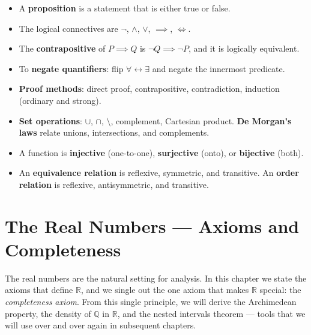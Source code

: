 \documentclass[12pt,a4paper,openany]{book}
\newcommand{\Q}{\mathbb{Q}}
\newcommand{\R}{\mathbb{R}}
\theoremstyle{definition}
\theoremstyle{remark}
\begin{document}
\begin{chaptersummary}
\begin{itemize}[leftmargin=1.5em]
  \item A \textbf{proposition} is a statement that is either true or false.
  \item The logical connectives are $\neg$, $\land$, $\lor$, $\implies$, $\iff$.
  \item The \textbf{contrapositive} of $P \implies Q$ is $\neg Q \implies \neg P$,
    and it is logically equivalent.
  \item To \textbf{negate quantifiers}: flip $\forall \leftrightarrow \exists$
    and negate the innermost predicate.
  \item \textbf{Proof methods}: direct proof, contrapositive, contradiction,
    induction (ordinary and strong).
  \item \textbf{Set operations}: $\cup$, $\cap$, $\setminus$, complement,
    Cartesian product.  \textbf{De Morgan's laws} relate unions, intersections,
    and complements.
  \item A function is \textbf{injective} (one-to-one), \textbf{surjective}
    (onto), or \textbf{bijective} (both).
  \item An \textbf{equivalence relation} is reflexive, symmetric, and transitive.
    An \textbf{order relation} is reflexive, antisymmetric, and transitive.
\end{itemize}
\end{chaptersummary}


\chapter{The Real Numbers --- Axioms and Completeness}
\label{ch:reals}

The real numbers are the natural setting for analysis.  In this chapter we
state the axioms that define $\R$, and we single out the one axiom that
makes $\R$ special: the \emph{completeness axiom}.  From this single
principle, we will derive the Archimedean property, the density of $\Q$ in
$\R$, and the nested intervals theorem --- tools that we will use over and
over again in subsequent chapters.
\end{document}
